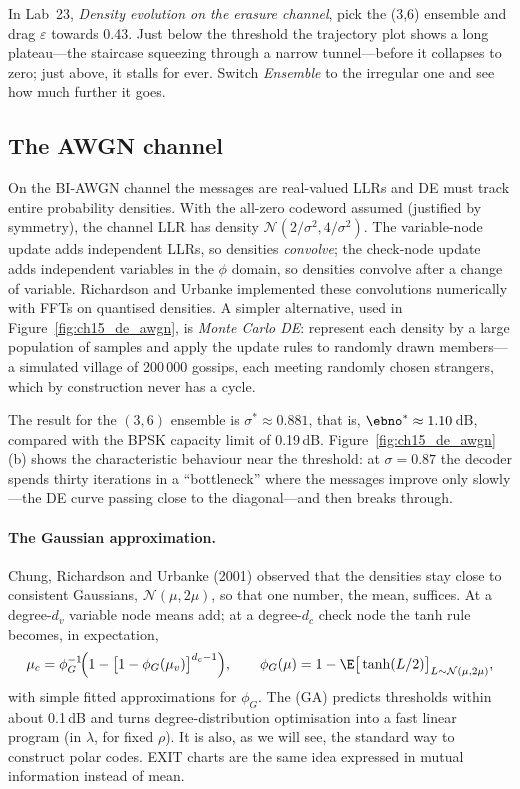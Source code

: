 \begin{tryit}
In Lab~23, \emph{Density evolution on the erasure channel}, pick the (3,6) ensemble and drag
$\varepsilon$ towards 0.43. Just below the threshold the trajectory plot shows a long plateau---the
staircase squeezing through a narrow tunnel---before it collapses to zero; just above, it stalls
for ever. Switch \emph{Ensemble} to the irregular one and see how much further it goes.
\end{tryit}

\subsection{The AWGN channel}

On the BI-AWGN channel the messages are real-valued LLRs and DE must track entire probability
densities. With the all-zero codeword assumed (justified by symmetry), the channel LLR has density
$\mathcal N(2/\sigma^2,4/\sigma^2)$. The variable-node update adds independent LLRs, so densities
\emph{convolve}; the check-node update adds independent variables in the $\phi$ domain, so densities
convolve after a change of variable. Richardson and Urbanke implemented these convolutions
numerically with FFTs on quantised densities. A simpler alternative, used in
Figure~\ref{fig:ch15_de_awgn}, is \emph{Monte Carlo DE}: represent each density by a large
population of samples and apply the update rules to randomly drawn members---a simulated village
of 200\,000 gossips, each meeting randomly chosen strangers, which by construction never has a
cycle.

The result for the $(3,6)$ ensemble is $\sigma^*\approx0.881$, that is, $\ebno^*\approx1.10$\,dB,
compared with the BPSK capacity limit of 0.19\,dB. Figure~\ref{fig:ch15_de_awgn}(b) shows the
characteristic behaviour near the threshold: at $\sigma=0.87$ the decoder spends thirty iterations
in a ``bottleneck'' where the messages improve only slowly---the DE curve passing close to the
diagonal---and then breaks through.

\paragraph{The Gaussian approximation.} Chung, Richardson and Urbanke (2001) observed that the
densities stay close to consistent Gaussians, $\mathcal N(\mu,2\mu)$, so that one number, the mean,
suffices. At a degree-$d_v$ variable node means add; at a degree-$d_c$ check node the tanh rule
becomes, in expectation,
\begin{equation}
\mu_c=\phi_G^{-1}\!\Big(1-\big[1-\phi_G(\mu_v)\big]^{d_c-1}\Big),\qquad
\phi_G(\mu)=1-\E\big[\tanh(L/2)\big]_{L\sim\mathcal N(\mu,2\mu)},
\label{eq:ch15:ga}
\end{equation}
with simple fitted approximations for $\phi_G$. The  (GA) predicts
thresholds within about 0.1\,dB and turns degree-distribution optimisation into a fast linear program
(in $\lambda$, for fixed $\rho$). It is also, as we will see, the standard way to construct polar
codes. EXIT charts are the same idea expressed in mutual information instead of mean.

